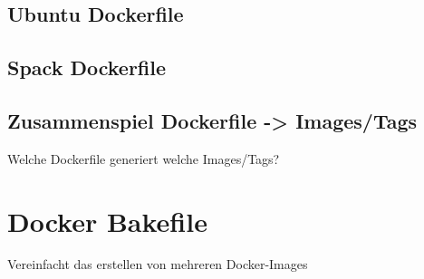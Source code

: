 \subsection{Ubuntu Dockerfile}

\subsection{Spack Dockerfile}

\subsection{Zusammenspiel Dockerfile -> Images/Tags}
Welche Dockerfile generiert welche Images/Tags?

\section{Docker Bakefile}

Vereinfacht das erstellen von mehreren Docker-Images